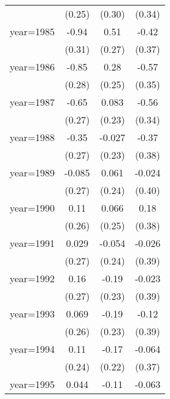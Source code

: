 \begin{sidewaystable}[htbp]
\begin{tabular}{l*{3}{c}}
                &   (0.25)         &   (0.30)         &   (0.34)         \\
\addlinespace
year=1985       &    -0.94\sym{***}&     0.51\sym{*}  &    -0.42         \\
                &   (0.31)         &   (0.27)         &   (0.37)         \\
\addlinespace
year=1986       &    -0.85\sym{***}&     0.28         &    -0.57         \\
                &   (0.28)         &   (0.25)         &   (0.35)         \\
\addlinespace
year=1987       &    -0.65\sym{**} &    0.083         &    -0.56         \\
                &   (0.27)         &   (0.23)         &   (0.34)         \\
\addlinespace
year=1988       &    -0.35         &   -0.027         &    -0.37         \\
                &   (0.27)         &   (0.23)         &   (0.38)         \\
\addlinespace
year=1989       &   -0.085         &    0.061         &   -0.024         \\
                &   (0.27)         &   (0.24)         &   (0.40)         \\
\addlinespace
year=1990       &     0.11         &    0.066         &     0.18         \\
                &   (0.26)         &   (0.25)         &   (0.38)         \\
\addlinespace
year=1991       &    0.029         &   -0.054         &   -0.026         \\
                &   (0.27)         &   (0.24)         &   (0.39)         \\
\addlinespace
year=1992       &     0.16         &    -0.19         &   -0.023         \\
                &   (0.27)         &   (0.23)         &   (0.39)         \\
\addlinespace
year=1993       &    0.069         &    -0.19         &    -0.12         \\
                &   (0.26)         &   (0.23)         &   (0.39)         \\
\addlinespace
year=1994       &     0.11         &    -0.17         &   -0.064         \\
                &   (0.24)         &   (0.22)         &   (0.37)         \\
\addlinespace
year=1995       &    0.044         &    -0.11         &   -0.063         \\

\end{tabular}
\end{sidewaystable}
